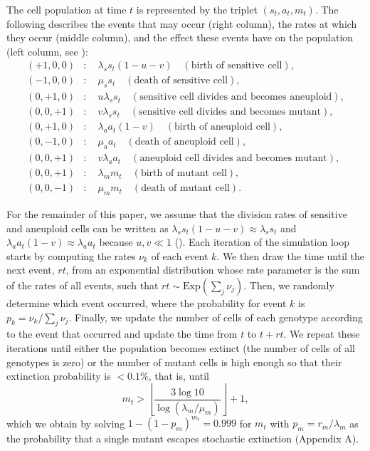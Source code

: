 \documentclass[12pt]{extarticle}
\renewcommand{\Delta}{r}
\begin{document}
The cell population at time $t$ is represented by the triplet $\left(s_t,a_t,m_t\right)$. The following describes the events that may occur (right column), the rates at which they occur (middle column), and the effect these events have on the population (left column, see ):
\[
\begin{aligned}
(+1,0,0)&:\quad \lambda_ss_t\left(1-u-v\right)\quad\left(\text{birth of sensitive cell}\right),\\
(-1,0,0)&:\quad \mu_ss_t\quad\left(\text{death of sensitive cell}\right),\\
(0,+1,0)&:\quad u\lambda_ss_t\quad\left(\text{sensitive cell divides and becomes aneuploid}\right),\\
(0,0,+1)&:\quad v\lambda_ss_t\quad\left(\text{sensitive cell divides and becomes mutant}\right),\\
(0,+1,0)&:\quad \lambda_aa_t\left(1-v\right)\quad\left(\text{birth of aneuploid cell}\right),\\
(0,-1,0)&:\quad \mu_aa_t\quad\left(\text{death of aneuploid cell}\right),\\
(0,0,+1)&:\quad v\lambda_aa_t\quad\left(\text{aneuploid cell divides and becomes mutant}\right),\\
(0,0,+1)&:\quad \lambda_mm_t\quad\left(\text{birth of mutant cell}\right),\\
(0,0,-1)&:\quad \mu_mm_t\quad\left(\text{death of mutant cell}\right).
\end{aligned}
\]

For the remainder of this paper, we assume that the division rates of sensitive and aneuploid cells can be written as $\lambda_ss_t\left(1-u-v\right)\approx \lambda_ss_t$ and $\lambda_aa_t\left(1-v\right)\approx\lambda_aa_t$ because $u,v\ll1$ ().
Each iteration of the simulation loop starts by computing the rates $\nu_k$ of each event $k$.
We then draw the time until the next event, $\Delta t$, from an exponential distribution whose rate parameter is the sum of the rates of all events, such that $\Delta t \sim \text{Exp}(\sum_j \nu_j)$.
Then, we randomly determine which event occurred, where the probability for event $k$ is $p_k = \nu_k/\sum_j \nu_j$.
Finally, we update the number of cells of each genotype according to the event that occurred and update the time from $t$ to $t+\Delta t$.
We repeat these iterations until either the population becomes extinct (the number of cells of all genotypes is zero) or the number of mutant cells is high enough so that their extinction probability is $<0.1\%$, that is, until
\begin{equation*}
m_t > \left\lfloor\frac{3\log{10}}{\log{\left(\lambda_m / \mu_m\right)}}\right\rfloor + 1 ,
\end{equation*}
which we obtain by solving $1-(1-p_m)^{m_t}=0.999$ for $m_t$ with $p_m=\Delta_m/\lambda_m$ as the probability that a single mutant escapes stochastic extinction (Appendix A).
\end{document}
